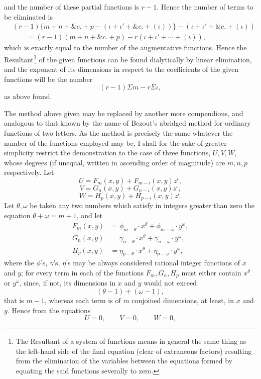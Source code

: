 \documentclass[11pt]{article}
\newcommand{\sourcepage}[1]{\marginpar{\scriptsize p.~#1}}
\begin{document}
{{\sourcepage{259}
and the number of these partial functions is $r-1$. Hence the number of terms to be eliminated is
\[
\begin{aligned}
&(r-1)\{m+n+\&c.+p-(\iota+\iota'+\&c.+(\iota))\}-(\iota+\iota'+\&c.+(\iota))\\
&\qquad=(r-1)(m+n+\&c.+p)-r(\iota+\iota'+\cdots+(\iota)),
\end{aligned}
\]
which is exactly equal to the number of the augmentative functions. Hence the Resultant\footnote{The Resultant of a system of functions means in general the same thing as the left-hand side of the final equation (clear of extraneous factors) resulting from the elimination of the variables between the equations formed by equating the said functions severally to zero.} of the given functions can be found dialytically by linear elimination, and the exponent of its dimensions in respect to the coefficients of the given functions will be the number
\[
(r-1)\Sigma m-r\Sigma\iota,
\]
as above found.

The method above given may be replaced by another more compendious, and analogous to that known by the name of Bezout's abridged method for ordinary functions of two letters. As the method is precisely the same whatever the number of the functions employed may be, I shall for the sake of greater simplicity restrict the demonstration to the case of three functions, $U,V,W$, whose degrees (if unequal, written in ascending order of magnitude) are $m,n,p$ respectively. Let
\[
U=F_m(x,y)+F_{m-\iota}(x,y)z^\iota,
\]
\[
V=G_n(x,y)+G_{n-\iota}(x,y)z^\iota,
\]
\[
W=H_p(x,y)+H_{p-\iota}(x,y)z^\iota.
\]
Let $\theta,\omega$ be taken any two numbers which satisfy in integers greater than zero the equation $\theta+\omega=m+1$, and let
\[
\begin{aligned}
F_m(x,y)&=\phi_{m-\theta}\cdot x^\theta+\phi_{m-\omega}\cdot y^\omega,\\
G_n(x,y)&=\gamma_{n-\theta}\cdot x^\theta+\gamma_{n-\omega}\cdot y^\omega,\\
H_p(x,y)&=\eta_{p-\theta}\cdot x^\theta+\eta_{p-\omega}\cdot y^\omega,
\end{aligned}
\]
where the $\phi$'s, $\gamma$'s, $\eta$'s may be always considered rational integer functions of $x$ and $y$; for every term in each of the functions $F_m,G_n,H_p$ must either contain $x^\theta$ or $y^\omega$, since, if not, its dimensions in $x$ and $y$ would not exceed
\[
(\theta-1)+(\omega-1),
\]
that is $m-1$, whereas each term is of $m$ conjoined dimensions, at least, in $x$ and $y$. Hence from the equations
\[
U=0,
\qquad V=0,
\qquad W=0,
\]

}}
\end{document}
